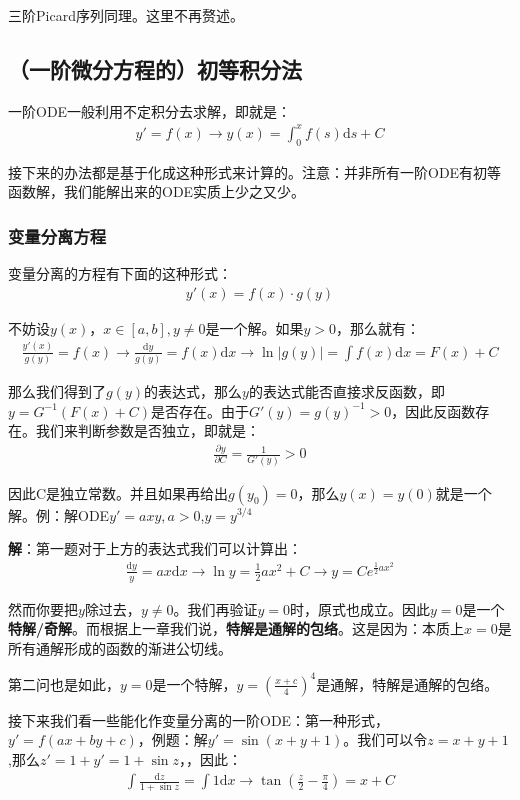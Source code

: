 \documentclass{ctexart}
\let\oldtextbf\textbf
\renewcommand{\textbf}[1]{\textcolor{brown!50!red}{\oldtextbf{#1}}}
\begin{document}
三阶Picard序列同理。这里不再赘述。

\subsection{（一阶微分方程的）初等积分法}
一阶ODE一般利用不定积分去求解，即就是：
\begin{align*}
y'=f(x)\to y(x)=\int_0^xf(s)\mathrm{d}s+C  
\end{align*}

接下来的办法都是基于化成这种形式来计算的。注意：并非所有一阶ODE有初等函数解，我们能解出来的ODE实质上少之又少。
\subsubsection{变量分离方程}
变量分离的方程有下面的这种形式：
\begin{align*}
y'(x)=f(x)\cdot g(y) 
\end{align*}

不妨设$y(x)，x\in[a,b],y\neq0$是一个解。如果$y>0$，那么就有：
\begin{align*}
\frac{y'(x)}{g(y)}=f(x)\to\frac{\mathrm{d}y }{g(y)}=f(x)\mathrm{d}x\to\ln|g(y)|=\int f(x)\mathrm{d}x  =F(x)+C   
\end{align*}

那么我们得到了$g(y)$的表达式，那么$y$的表达式能否直接求反函数，即$y=G^{-1}(F(x)+C)$是否存在。由于$G'(y)=g(y)^{-1}>0$，因此反函数存在。我们来判断参数是否独立，即就是：
\begin{align*}
\frac{\partial  y}{\partial C}=\frac{1}{G'(y)}> 0
\end{align*}

因此C是独立常数。并且如果再给出$g(y_0)=0$，那么$y(x)=y(0)$就是一个解。例：解ODE$y'=axy,a>0$,$y=y^{3/4}$

\textbf{\color{brown!50!red}解}：第一题对于上方的表达式我们可以计算出：
\begin{align*}
\frac{\mathrm{d}y}{y}=ax\mathrm{d}x\to \ln y=\frac{1}{2}ax^2+C\to y=Ce^{\frac{1}{2}ax^2 }  
\end{align*}

然而你要把$y$除过去，$y\neq 0$。我们再验证$y=0$时，原式也成立。因此$y=0$是一个\textbf{\color{brown!50!red}特解/奇解}。而根据上一章我们说，\textbf{\color{brown!50!red}特解是通解的包络}。这是因为：本质上$x=0$是所有通解形成的函数的渐进公切线。

第二问也是如此，$y=0$是一个特解，$y=(\frac{x+c}{4})^4$是通解，特解是通解的包络。

接下来我们看一些能化作变量分离的一阶ODE：第一种形式，$y'=f(ax+by+c)$，例题：解$y'=\sin(x+y+1)$。我们可以令$z=x+y+1$,那么$z'=1+y'=1+\sin z$，，因此：
\begin{align*}
\int\frac{\mathrm{d}z }{1+\sin z}=\int 1\mathrm{d}x\to \tan(\frac{z}{2}-\frac{\pi}{4} )=x+C
\end{align*}
\end{document}
